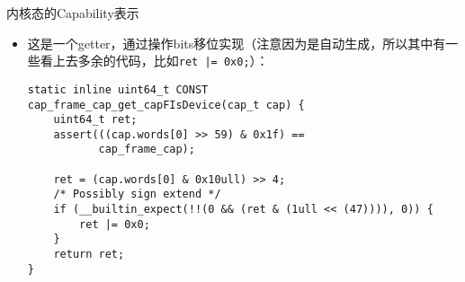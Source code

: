 \documentclass[presentation,dvipdfmx,CJKbookmarks]{beamer}
\begin{document}
\begin{CJK*}{UTF8}{simsun}
\begin{frame}[label={sec:org5b08469},fragile]{内核态的\thinspace Capability\thinspace 表示}
\begin{enumerate}
\begin{itemize}
\begin{verbatim}
\end{verbatim}

\item 这是一个\thinspace getter，通过操作\thinspace bits\thinspace 移位实现（注意因为是自动生成，所以其中有一些看上去多余的代码，比如\thinspace \texttt{ret |= 0x0;}）：

\begin{verbatim}
static inline uint64_t CONST
cap_frame_cap_get_capFIsDevice(cap_t cap) {
    uint64_t ret;
    assert(((cap.words[0] >> 59) & 0x1f) ==
           cap_frame_cap);

    ret = (cap.words[0] & 0x10ull) >> 4;
    /* Possibly sign extend */
    if (__builtin_expect(!!(0 && (ret & (1ull << (47)))), 0)) {
        ret |= 0x0;
    }
    return ret;
}
\end{verbatim}
\end{itemize}
\end{enumerate}
\end{frame}
\end{CJK*}
\end{document}
